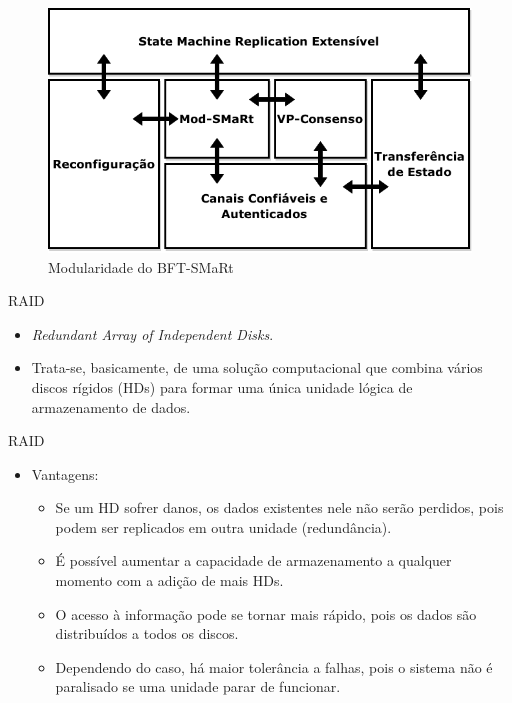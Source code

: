 \begin{frame}{}		
	\begin{figure}
		\includegraphics[width=\textwidth]{imagens/bftsmart1}
		\caption{Modularidade do BFT-SMaRt}
		\label{fig:bftsmart1}
	\end{figure}
\end{frame}


\begin{frame}{RAID}
	
	\begin{itemize}
		\item \textit{Redundant Array of Independent Disks}.
		\item Trata-se, basicamente, de uma solução computacional que combina vários discos rígidos (HDs) para formar uma única unidade lógica de armazenamento de dados.
	\end{itemize}
\end{frame}

\begin{frame}{RAID}
	
	\begin{itemize}
		\item Vantagens:
		\begin{itemize}
			\item Se um HD sofrer danos, os dados existentes nele não serão perdidos, pois podem ser replicados em outra unidade (redundância).
			\item É possível aumentar a capacidade de armazenamento a qualquer momento com a adição de mais HDs.
			\item O acesso à informação pode se tornar mais rápido, pois os dados são distribuídos a todos os discos.
			\item Dependendo do caso, há maior tolerância a falhas, pois o sistema não é paralisado se uma unidade parar de funcionar.
		\end{itemize}
	\end{itemize}
\end{frame}

